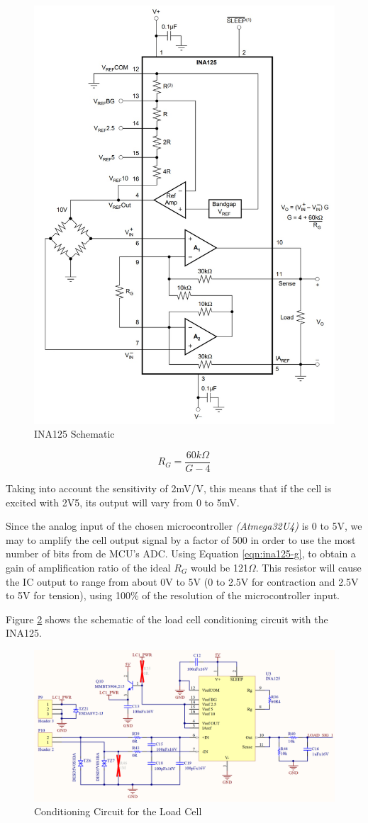	\begin{figure}[htbp]
		\centering
		\includegraphics[width=.6\textwidth]{figuras/fig-ina125-functional-block}
		\caption{INA125 Schematic \cite{ina125}}
		\label{fig:ina125-functional-block}
	\end{figure}

	\begin{equation}\label{eqn:ina125-g}
		R_{G}=\frac{60k\Omega}{G - 4}
	\end{equation}

	Taking into account the sensitivity of 2mV/V, this means that if the cell is excited with 2V5, its output will vary from 0 to 5mV.
	\par
	Since the analog input of the chosen microcontroller \textit{(Atmega32U4)} is 0 to 5V, we may to amplify the cell output signal by a factor of 500 in order to use the most number of bits from de MCU's ADC. Using Equation \ref{eqn:ina125-g}, to obtain a gain of amplification ratio of the ideal $R_{G}$ would be 121$\Omega$. This resistor will cause the IC output to range from about 0V to 5V (0 to 2.5V for contraction and 2.5V to 5V for tension), using 100\% of the resolution of the microcontroller input. 
	\par
	Figure \ref{fig:cic-cell} shows the schematic of the load cell conditioning circuit with the INA125.

	\begin{figure}[htbp]
		\centering
		\includegraphics[width=1\textwidth]{figuras/fig-cic-cell}
		\caption{Conditioning Circuit for the Load Cell}
		\label{fig:cic-cell}
	\end{figure}

